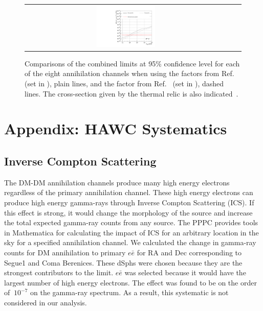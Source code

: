 \begin{figure}[ht]
{\begin{tabular}{ccc}
    \includegraphics[width=0.3\textwidth]{figures/glory_duck/comparison/GD_limits_tautau.pdf} &
    \end{tabular}
    }
    \caption{Comparisons of the combined limits at 95\% confidence level for each of the eight annihilation channels when using the \J factors from Ref.~\cite{Geringer-Sameth:2014yza} (\GS set in ), plain lines, and the \J factor from Ref.~\cite{Bonnivard:2014kza, Bonnivard:2015xpq} (\B set in ), dashed lines. The cross-section given by the thermal relic is also indicated~\cite{Bertone_2005}.}
\label{fig:limits-comparison}
\end{figure}

\section{Appendix: HAWC Systematics} \label{sec:hawc_systematic}

\subsection{Inverse Compton Scattering} \label{sec:gd_ics}
The DM-DM annihilation channels produce many high energy electrons regardless of the primary annihilation channel.
These high energy electrons can produce high energy gamma-rays through Inverse Compton Scattering (ICS).
If this effect is strong, it would change the morphology of the source and increase the total expected gamma-ray counts from any source.
The PPPC \cite{Cirelli_2011} provides tools in Mathematica for calculating the impact of ICS for an arbitrary location in the sky for a specified annihilation channel.
We calculated the change in gamma-ray counts for DM annihilation to primary $e\bar{e}$ for RA and Dec corresponding to Segue1 and Coma Berenices.
These dSphs were chosen because they are the strongest contributors to the limit.
$e\bar{e}$ was selected because it would have the largest number of high energy electrons.
The effect was found to be on the order of $~10^{-7}$ on the gamma-ray spectrum.
As a result, this systematic is not considered in our analysis.

